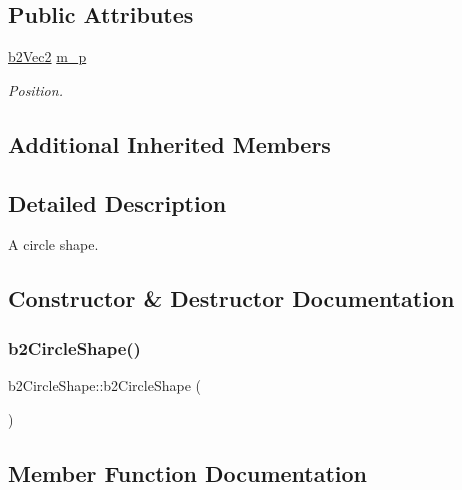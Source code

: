 \subsection*{Public Attributes}
\begin{DoxyCompactItemize}
\item 
\mbox{\hyperlink{structb2_vec2}{b2\+Vec2}} \mbox{\hyperlink{classb2_circle_shape_a190705618b2e65f636f1dc03c63640ff}{m\+\_\+p}}
\begin{DoxyCompactList}\small\item\em Position. \end{DoxyCompactList}\end{DoxyCompactItemize}
\subsection*{Additional Inherited Members}


\subsection{Detailed Description}
A circle shape. 

\subsection{Constructor \& Destructor Documentation}
\mbox{\label{classb2_circle_shape_a73bb9f0ea1c28d772db1192c52572018}} 
\subsubsection{\texorpdfstring{b2CircleShape()}{b2CircleShape()}}
{\footnotesize\ttfamily b2\+Circle\+Shape\+::b2\+Circle\+Shape (\begin{DoxyParamCaption}{ }\end{DoxyParamCaption})\hspace{0.3cm}{\ttfamily [inline]}}



\subsection{Member Function Documentation}
\mbox{\label{classb2_circle_shape_a5ff8fbab7dff87784fbff20b07e55cfc}} 
